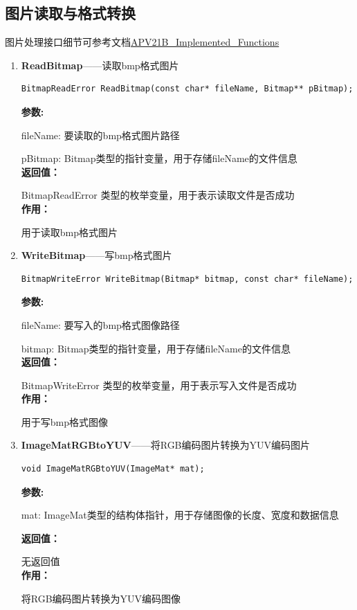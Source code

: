 \documentclass[12pt, a4paper, oneside]{ctexbook}
\begin{document}
		\subsection{图片读取与格式转换}
		图片处理接口细节可参考文档\href{.ref/APV21B_Implemented_Functions.pdf}{APV21B_Implemented_Functions}
		\begin{enumerate}
			\item \textbf{ReadBitmap}——读取bmp格式图片
				\begin{lstlisting}[numbers=none]
BitmapReadError ReadBitmap(const char* fileName, Bitmap** pBitmap);
				\end{lstlisting}
				\textbf{参数:} \par fileName: 要读取的bmp格式图片路径 \par pBitmap: Bitmap类型的指针变量，用于存储fileName的文件信息 \\
				\textbf{返回值：}\par BitmapReadError 类型的枚举变量，用于表示读取文件是否成功\\
				\textbf{作用：}\par 用于读取bmp格式图片\\
			
			\item \textbf{WriteBitmap}——写bmp格式图片
				\begin{lstlisting}[numbers=none]
BitmapWriteError WriteBitmap(Bitmap* bitmap, const char* fileName);
				\end{lstlisting}
				\textbf{参数:} \par fileName: 要写入的bmp格式图像路径 \par bitmap: Bitmap类型的指针变量，用于存储fileName的文件信息 \\
				\textbf{返回值：}\par BitmapWriteError 类型的枚举变量，用于表示写入文件是否成功\\
				\textbf{作用：}\par 用于写bmp格式图像\\
			
			\item \textbf{ImageMatRGBtoYUV}——将RGB编码图片转换为YUV编码图片
				\begin{lstlisting}[numbers=none]
void ImageMatRGBtoYUV(ImageMat* mat);
				\end{lstlisting}
				\textbf{参数:} \par mat: ImageMat类型的结构体指针，用于存储图像的长度、宽度和数据信息\par 
				\textbf{返回值：}\par 无返回值 \\
				\textbf{作用：}\par  将RGB编码图片转换为YUV编码图像\\


\end{enumerate}
\end{document}
